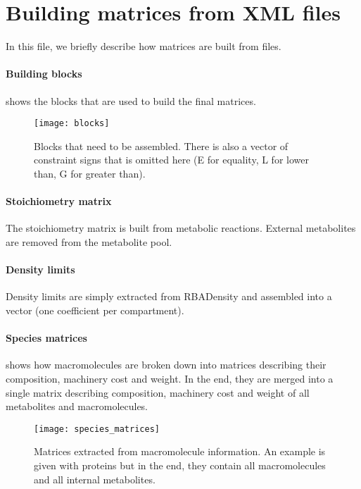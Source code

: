\section{Building matrices from XML files}

In this file, we briefly describe how matrices are built from files.

\paragraph{Building blocks}
 shows the blocks that are used to build the final matrices.
\begin{figure}
  \centering
  \texttt{[image: blocks]}
  \caption{Blocks that need to be assembled.
  There is also a vector of constraint signs that is omitted here
  (E for equality, L for lower than, G for greater than).}
  \label{fig:blocks}
\end{figure}

\paragraph{Stoichiometry matrix}
The stoichiometry matrix is built from metabolic reactions.
External metabolites are removed from the metabolite pool.

\paragraph{Density limits}
Density limits are simply extracted from RBADensity and assembled into a vector (one coefficient per compartment).

\paragraph{Species matrices}
 shows how macromolecules are broken down
into matrices describing their composition, machinery cost and weight.
In the end, they are merged into a single matrix describing composition,
machinery cost and weight of all metabolites and macromolecules.
\begin{figure}
  \centering
  \texttt{[image: species\_matrices]}
  \caption{Matrices extracted from macromolecule information.
  An example is given with proteins but in the end,
  they contain all macromolecules and all internal metabolites.}
  \label{fig:species_matrices}
\end{figure}

